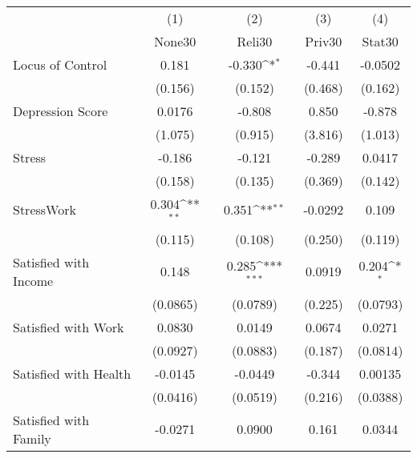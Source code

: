 {
\def\sym#1{\ifmmode^{#1}\else\(^{#1}\)\fi}
\begin{tabular}{l*{4}{c}}
\hline\hline
            &\multicolumn{1}{c}{(1)}&\multicolumn{1}{c}{(2)}&\multicolumn{1}{c}{(3)}&\multicolumn{1}{c}{(4)}\\
            &\multicolumn{1}{c}{None30}&\multicolumn{1}{c}{Reli30}&\multicolumn{1}{c}{Priv30}&\multicolumn{1}{c}{Stat30}\\
\hline
Locus of Control&       0.181         &      -0.330\sym{*}  &      -0.441         &     -0.0502         \\
            &     (0.156)         &     (0.152)         &     (0.468)         &     (0.162)         \\
[1em]
Depression Score&      0.0176         &      -0.808         &       0.850         &      -0.878         \\
            &     (1.075)         &     (0.915)         &     (3.816)         &     (1.013)         \\
[1em]
Stress      &      -0.186         &      -0.121         &      -0.289         &      0.0417         \\
            &     (0.158)         &     (0.135)         &     (0.369)         &     (0.142)         \\
[1em]
StressWork  &       0.304\sym{**} &       0.351\sym{**} &     -0.0292         &       0.109         \\
            &     (0.115)         &     (0.108)         &     (0.250)         &     (0.119)         \\
[1em]
Satisfied with Income&       0.148         &       0.285\sym{***}&      0.0919         &       0.204\sym{*}  \\
            &    (0.0865)         &    (0.0789)         &     (0.225)         &    (0.0793)         \\
[1em]
Satisfied with Work&      0.0830         &      0.0149         &      0.0674         &      0.0271         \\
            &    (0.0927)         &    (0.0883)         &     (0.187)         &    (0.0814)         \\
[1em]
Satisfied with Health&     -0.0145         &     -0.0449         &      -0.344         &     0.00135         \\
            &    (0.0416)         &    (0.0519)         &     (0.216)         &    (0.0388)         \\
[1em]
Satisfied with Family&     -0.0271         &      0.0900         &       0.161         &      0.0344         \\

\end{tabular}}
